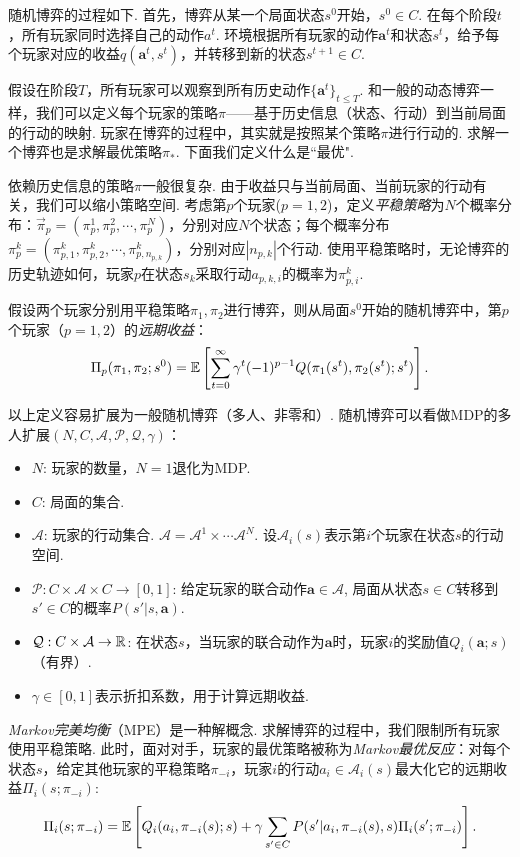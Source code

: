 随机博弈的过程如下. 首先，博弈从某一个局面状态$s^0$开始，$s^0\in C$. 在每个阶段$t$，所有玩家同时选择自己的动作$a^t$. 环境根据所有玩家的动作$\boldsymbol a^t$和状态$s^t$，给予每个玩家对应的收益$q(\boldsymbol a^t, s^t)$，并转移到新的状态$s^{t+1}\in C$. 

假设在阶段$T$，所有玩家可以观察到所有历史动作$\{\boldsymbol a^t\}_{t\leq T}$. 和一般的动态博弈一样，我们可以定义每个玩家的策略$\pi$——基于历史信息（状态、行动）到当前局面的行动的映射. 玩家在博弈的过程中，其实就是按照某个策略$\pi$进行行动的. 求解一个博弈也是求解最优策略$\pi_*$. 下面我们定义什么是``最优".

依赖历史信息的策略$\pi$一般很复杂. 由于收益只与当前局面、当前玩家的行动有关，我们可以缩小策略空间. 考虑第$p$个玩家($p=1,2$)，定义\emph{平稳策略}为$N$个概率分布：$\vec \pi_p=(\pi_p^1,\pi_p^2,\cdots,\pi_p^N)$，分别对应$N$个状态；每个概率分布$\pi_p^k=(\pi_{p,1}^k,\pi_{p,2}^k,\cdots,\pi_{p,n_{p,k}}^k)$，分别对应$|n_{p,k}|$个行动. 使用平稳策略时，无论博弈的历史轨迹如何，玩家$p$在状态$s_k$采取行动$a_{p,k,i}$的概率为$\pi_{p,i}^k$.

假设两个玩家分别用平稳策略$\pi_1,\pi_2$进行博弈，则从局面$s^0$开始的随机博弈中，第$p$个玩家（$p=1,2$）的\emph{远期收益}：
        \[\Pi_p(\pi_1,\pi_2; s^0) = \mathbb{E}\left[\sum_{t=0}^\infty \gamma^t(-1)^{p-1} Q(\pi_1(s^t),\pi_2(s^t); {s^t}) \right].\]

以上定义容易扩展为一般随机博弈（多人、非零和）. 随机博弈可以看做MDP的多人扩展$(N, C, \mathcal A, \mathcal P,\mathcal Q, \gamma)$：
\begin{itemize}
    \item $N$: 玩家的数量，$N=1$退化为MDP.
    \item $C$: 局面的集合.
    \item $\mathcal A$: 玩家的行动集合. $\mathcal A=\mathcal A^1\times \cdots\mathcal A^N$. 设$\mathcal A_i(s)$表示第$i$个玩家在状态$s$的行动空间.
    \item $\mathcal P: C\times \mathcal A\times C\to [0,1]$: 给定玩家的联合动作$\boldsymbol a\in\mathcal A$, 局面从状态$s\in C$转移到$s'\in C$的概率$P(s'|s,\boldsymbol a)$.
    \item $\mathcal Q: C\times \mathcal A\to \mathbb{R}$: 在状态$s$，当玩家的联合动作为$\boldsymbol a$时，玩家$i$的奖励值$Q_i(\boldsymbol a;s)$（有界）. 
    \item $\gamma\in[0,1]$表示折扣系数，用于计算远期收益.
\end{itemize}

\emph{Markov完美均衡}（MPE）是一种解概念. 求解博弈的过程中，我们限制所有玩家使用平稳策略. 此时，面对对手，玩家的最优策略被称为\emph{Markov最优反应}：对每个状态$s$，给定其他玩家的平稳策略$\pi_{-i}$，玩家$i$的行动$a_i\in \mathcal A_i(s)$最大化它的远期收益$\Pi_i(s;\pi_{-i})$:
    \[\Pi_i(s;\pi_{-i}) = \mathbb{E}\left[Q_i(a_i,\pi_{-i}(s);s) + \gamma\sum_{s'\in C} P(s'|a_i,\pi_{-i}(s),s)\Pi_i(s';\pi_{-i}) \right].\]

